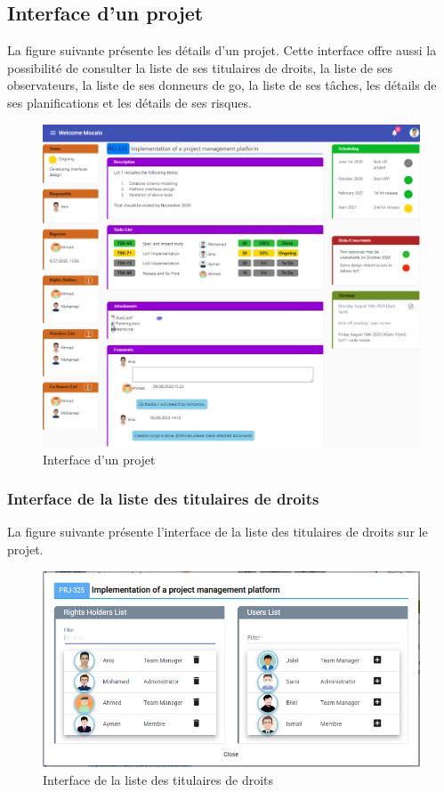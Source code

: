 \subsection{	Interface d’un projet}
\hspace{4mm}La figure suivante présente les détails d’un projet. Cette interface offre aussi la possibilité de consulter la liste de ses titulaires de droits, la liste de ses observateurs, la liste de ses donneurs de go, la liste de ses tâches, les détails de ses planifications et les détails de ses risques.
\begin{figure}[h]
    \centering
    \includegraphics{figures/33anis20.png}
    \caption{Interface d’un projet}
    \label{fig:interface_projet}
\end{figure}\newpage
\subsubsection{	Interface de la liste des titulaires de droits }
\hspace{4mm}La figure suivante présente l’interface de la liste des titulaires de droits sur le projet.
\begin{figure}[h]
    \centering
    \includegraphics{figures/33anis21.png}
    \caption{Interface de la liste des titulaires de droits}
    \label{fig:interface_titulaires}
\end{figure}
